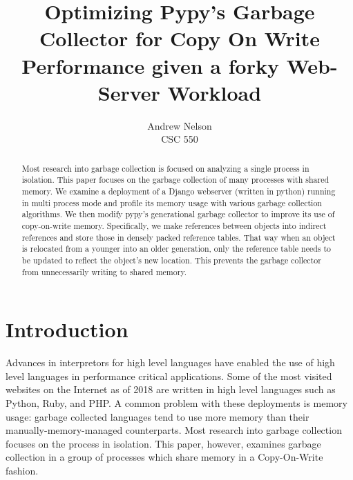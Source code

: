 \documentclass{article}
\begin{document}
  \begin{titlepage}
	\title{Optimizing Pypy's Garbage Collector for Copy On Write Performance given a forky Web-Server Workload}
	\author{Andrew Nelson\\CSC 550}

	\maketitle

	\begin{abstract}
	  Most research into garbage collection is focused on analyzing a single process in isolation.  This paper focuses on the garbage collection of many processes with shared memory.  We examine a deployment of a Django webserver (written in python) running in multi process mode and profile its memory usage with various garbage collection algorithms.  We then modify pypy's generational garbage collector to improve its use of copy-on-write memory.  Specifically, we make references between objects into indirect references and store those in densely packed reference tables.  That way when an object is relocated from a younger into an older generation, only the reference table needs to be updated to reflect the object's new location.  This prevents the garbage collector from unnecessarily writing to shared memory.  
	\end{abstract}
  \end{titlepage}

  \newpage

  \tableofcontents

  \newpage
  \twocolumn


  \section{Introduction}
  Advances in interpretors for high level languages have enabled the use of high level languages in performance critical applications.  Some of the most visited websites on the Internet as of 2018 are written in high level languages such as Python, Ruby, and PHP.  A common problem with these deployments is memory usage: garbage collected languages tend to use more memory than their manually-memory-managed counterparts.  Most research into garbage collection focuses on the process in isolation.  This paper, however, examines garbage collection in a group of processes which share memory in a Copy-On-Write fashion.  
\end{document}
